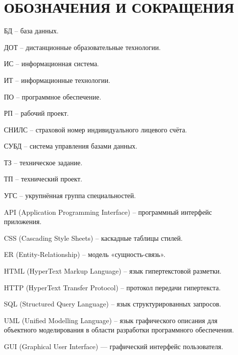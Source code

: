 \section*{ОБОЗНАЧЕНИЯ И СОКРАЩЕНИЯ}

БД -- база данных.

ДОТ -- дистанционные образовательные технологии.

ИС -- информационная система.

ИТ -- информационные технологии.

ПО -- программное обеспечение.

РП -- рабочий проект.

СНИЛС -- страховой номер индивидуального лицевого счёта.

СУБД -- система управления базами данных.

ТЗ -- техническое задание.

ТП -- технический проект.

УГС -- укрупнённая группа специальностей.

API (Application Programming Interface) -- программный интерфейс приложения.

CSS (Cascading Style Sheets) -- каскадные таблицы стилей.

ER (Entity-Relationship) -- модель «сущность-связь».

HTML (HyperText Markup Language) -- язык гипертекстовой разметки.

HTTP (HyperText Transfer Protocol) -- протокол передачи гипертекста.

SQL (Structured Query Language) -- язык структурированных запросов.

UML (Unified Modelling Language) -- язык графического описания для объектного моделирования в области разработки программного обеспечения.

GUI (Graphical User Interface) — графический интерфейс пользователя.